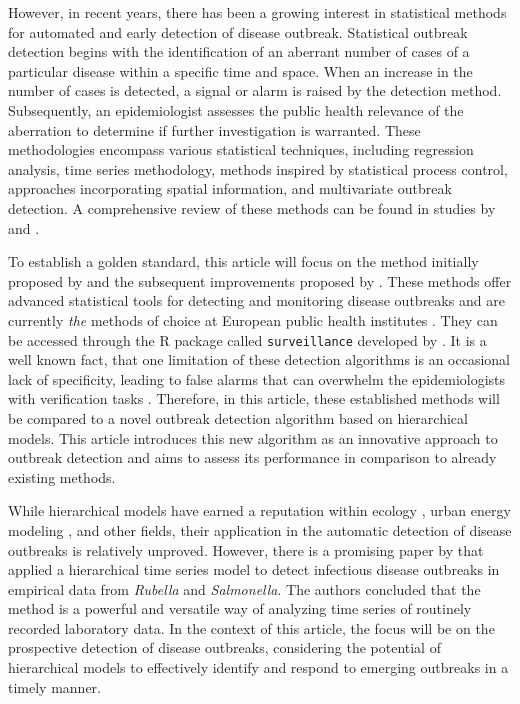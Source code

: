 \documentclass[preprint, 3p, authoryear]{elsarticle} %
\begin{document}
However, in recent years, there has been a growing interest in statistical methods for automated and early detection of disease outbreak. Statistical outbreak detection begins with the identification of an aberrant number of cases of a particular disease within a specific time and space. When an increase in the number of cases is detected, a signal or alarm is raised by the detection method. Subsequently, an epidemiologist assesses the public health relevance of the aberration to determine if further investigation is warranted. These methodologies encompass various statistical techniques, including regression analysis, time series methodology, methods inspired by statistical process control, approaches incorporating spatial information, and multivariate outbreak detection. A comprehensive review of these methods can be found in studies by \citet{Buckeridge_2007} and \citet{Unkel_2012}.

To establish a golden standard, this article will focus on the method initially proposed by \citet{Farrington_1996} and the subsequent improvements proposed by \citet{Noufaily_2013}. These methods offer advanced statistical tools for detecting and monitoring disease outbreaks and are currently \emph{the} methods of choice at European public health institutes \citep{Hulth_2010}. They can be accessed through the R package called \texttt{surveillance} developed by \citet{Salmon_2016}. It is a well known fact, that one limitation of these detection algorithms is an occasional lack of specificity, leading to false alarms that can overwhelm the epidemiologists with verification tasks \citep{Bedubourg_2017}. Therefore, in this article, these established methods will be compared to a novel outbreak detection algorithm based on hierarchical models. This article introduces this new algorithm as an innovative approach to outbreak detection and aims to assess its performance in comparison to already existing methods.

While hierarchical models have earned a reputation within ecology \citep[\citet{Zuur_2009}]{Bolker_2009}, urban energy modeling \citep[\citet{Jaume_2022}]{Real_2021}, and other fields, their application in the automatic detection of disease outbreaks is relatively unproved. However, there is a promising paper by \citet{Heisterkamp_2006} that applied a hierarchical time series model to detect infectious disease outbreaks in empirical data from \emph{Rubella} and \emph{Salmonella}. The authors concluded that the method is a powerful and versatile way of analyzing time series of routinely recorded laboratory data. In the context of this article, the focus will be on the prospective detection of disease outbreaks, considering the potential of hierarchical models to effectively identify and respond to emerging outbreaks in a timely manner.
\end{document}
